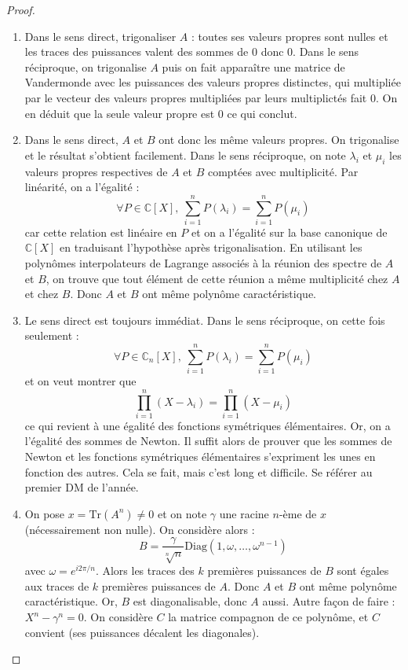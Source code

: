 \documentclass[french,a4paper]{article}
\newcommand{\C}{\mathbb{C}}
\newcommand{\Tr}{\text{Tr}}
\theoremstyle{plain}
\theoremstyle{definition}
\theoremstyle{remark}
\begin{document}
\begin{proof}
	\begin{enumerate}
		\item Dans le sens direct, trigonaliser $A$ : toutes ses valeurs propres sont nulles et les traces des puissances valent des sommes de $0$ donc $0$. Dans le sens réciproque, on trigonalise $A$ puis on fait apparaître une matrice de Vandermonde avec les puissances des valeurs propres distinctes, qui multipliée par le vecteur des valeurs propres multipliées par leurs multiplictés fait $0$. On en déduit que la seule valeur propre est $0$ ce qui conclut.
		\item Dans le sens direct, $A$ et $B$ ont donc les même valeurs propres. On trigonalise et le résultat s'obtient facilement. Dans le sens réciproque, on note $\lambda_i$ et $\mu_i$ les valeurs propres respectives de $A$ et $B$ comptées avec multiplicité. Par linéarité, on a l'égalité : $$\forall P\in\C[X],\ \sum_{i=1}^{n}P(\lambda_i)=\sum_{i=1}^{n}P(\mu_i)$$ car cette relation est linéaire en $P$ et on a l'égalité sur la base canonique de $\C[X]$ en traduisant l'hypothèse après trigonalisation. En utilisant les polynômes interpolateurs de Lagrange associés à la réunion des spectre de $A$ et $B$, on trouve que tout élément de cette réunion a même multiplicité chez $A$ et chez $B$. Donc $A$ et $B$ ont même polynôme caractéristique.
		\item Le sens direct est toujours immédiat. Dans le sens réciproque, on cette fois seulement : $$\forall P\in\C_n[X],\ \sum_{i=1}^{n}P(\lambda_i)=\sum_{i=1}^{n}P(\mu_i)$$ et on veut montrer que $$\prod_{i=1}^{n}(X-\lambda_i)=\prod_{i=1}^{n}(X-\mu_i)$$ ce qui revient à une égalité des fonctions symétriques élémentaires. Or, on a l'égalité des sommes de Newton. Il suffit alors de prouver que les sommes de Newton et les fonctions symétriques élémentaires s'expriment les unes en fonction des autres. Cela se fait, mais c'est long et difficile. Se référer au premier DM de l'année.
		\item On pose $x=\Tr(A^n)\ne 0$ et on note $\gamma$ une racine $n$-ème de $x$ (nécessairement non nulle). On considère alors : $$B=\frac{\gamma}{\sqrt[n]{n}}\text{Diag}(1,\omega,\ldots,\omega^{n-1})$$ avec $\omega=e^{i2\pi/n}$. Alors les traces des $k$ premières puissances de $B$ sont égales aux traces de $k$ premières puissances de $A$. Donc $A$ et $B$ ont même polynôme caractéristique. Or, $B$ est diagonalisable, donc $A$ aussi. Autre façon de faire : $X^n-\gamma^n=0$. On considère $C$ la matrice compagnon de ce polynôme, et $C$ convient (ses puissances décalent les diagonales).
	\end{enumerate}
\end{proof}
\end{document}
